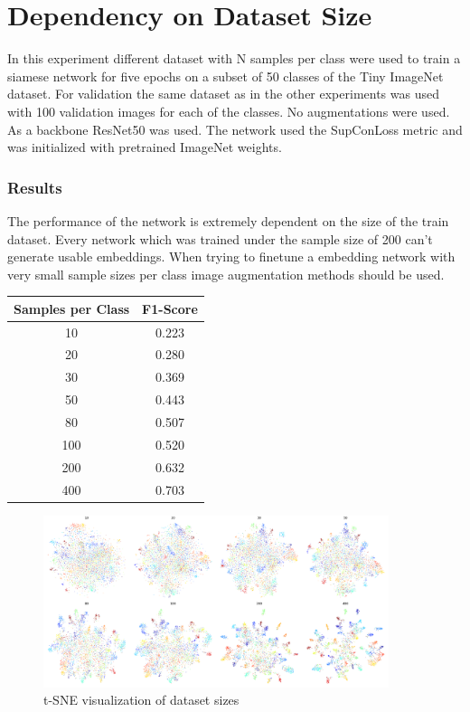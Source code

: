 \documentclass[12pt,a4paper]{report}
\newcommand{\splitlayout}[2]{
	\begin{minipage}{0.6\textwidth}
		#1
	\end{minipage}
	\hfill
	\begin{minipage}{0.35\textwidth}
		#2
	\end{minipage}	
}
\begin{document}
\newpage


\section{Dependency on Dataset Size}

In this experiment different dataset with N samples per class were used to train a siamese network for five epochs on a subset of 50 classes of the Tiny ImageNet dataset.
For validation the same dataset as in the other experiments was used with 100 validation images for each of the classes.
No augmentations were used.
As a backbone ResNet50 was used.
The network used the SupConLoss metric and was initialized with pretrained ImageNet weights.


\subsubsection{Results}
\splitlayout{
	The performance of the network is extremely dependent on the size of the train dataset.
	Every network which was trained under the sample size of 200 can't generate usable embeddings.
	When trying to finetune a embedding network with very small sample sizes per class image augmentation methods should be used. 
}{
	\begin{tabular}{ | c | c | }
		\hline
		Samples per Class &  F1-Score \\ 
		\hline
		10 &  0.223 \\ 
		\hline
		20 & 0.280 \\ 
		\hline
		30 & 0.369 \\ 
		\hline
		50 & 0.443 \\ 
		\hline
		80 & 0.507  \\ 
		\hline
		100 & 0.520 \\ 
		\hline
		200 & 0.632 \\ 
		\hline
		400 & 0.703 \\ 
		\hline
	\end{tabular}
}

\begin{figure}[hb]
	\centering
	\includegraphics[width=0.9\textwidth]{../plots/dataset_size.png}
	\caption{t-SNE visualization of dataset sizes}
\end{figure}
\end{document}
